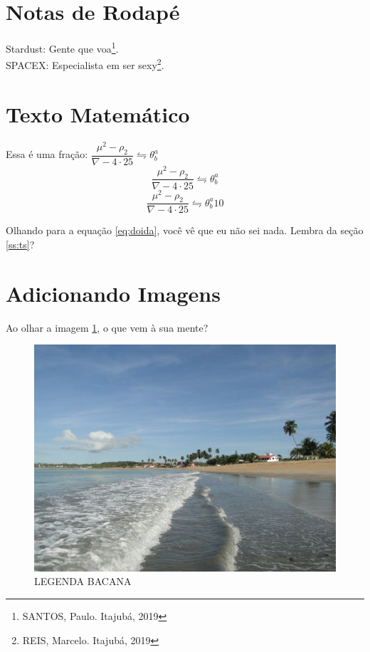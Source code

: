 \documentclass[11pt,a4paper]{article}
\begin{document}
\newpage
\section{Notas de Rodapé}

Stardust: Gente que voa\footnote{SANTOS, Paulo. Itajubá, 2019}.\\
SPACEX: Especialista em ser sexy\footnote{REIS, Marcelo. Itajubá, 2019}.

\section{Texto Matemático}

Essa é uma fração: $\dfrac{\mu^2 - \rho_2}{\nabla - 4 \cdot 25} \leftrightharpoons \theta_b^a$
$$\dfrac{\mu^2 - \rho_2}{\nabla - 4 \cdot 25} \leftrightharpoons \theta_b^a$$
\begin{equation}
\dfrac{\mu^2 - \rho_2}{\nabla - 4 \cdot 25} \leftrightharpoons \theta_b^a 10
\label{eq:doida}
\end{equation}

Olhando para a equação \eqref{eq:doida}, você vê que eu não sei nada. Lembra da seção \ref{ss:ts}?

\newpage
\section{Adicionando Imagens}

Ao olhar a imagem \ref{fi:bacana}, o que vem à sua mente?
\begin{figure}[!h]
\centering
\includegraphics[width=.84\textwidth]{1.jpg}
\caption{LEGENDA BACANA}
\label{fi:bacana}
\end{figure}
\end{document}
